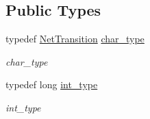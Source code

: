 \subsection*{Public Types}
\begin{DoxyCompactItemize}
\item 
typedef \hyperlink{class_net_transition}{Net\+Transition} \hyperlink{class_net_transition_a40ad367a5a816d31e7559037c76970f0}{char\+\_\+type}\hypertarget{class_net_transition_a40ad367a5a816d31e7559037c76970f0}{}\label{class_net_transition_a40ad367a5a816d31e7559037c76970f0}

\begin{DoxyCompactList}\small\item\em char\+\_\+type \end{DoxyCompactList}\item 
typedef long \hyperlink{class_net_transition_a0f9d17d0e4e371ec89c6c2f4bccd1a63}{int\+\_\+type}\hypertarget{class_net_transition_a0f9d17d0e4e371ec89c6c2f4bccd1a63}{}\label{class_net_transition_a0f9d17d0e4e371ec89c6c2f4bccd1a63}

\begin{DoxyCompactList}\small\item\em int\+\_\+type \end{DoxyCompactList}\end{DoxyCompactItemize}
